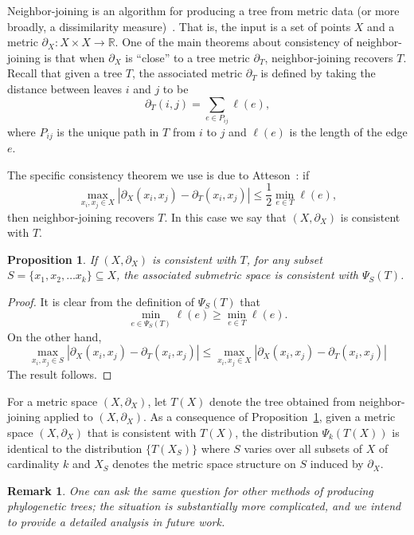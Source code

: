 \documentclass[a4paper,11pt]{article}
\newtheorem{proposition}[theorem]{Proposition}
\newtheorem{remark}[theorem]{Remark}
\begin{document}
Neighbor-joining is an algorithm for producing a tree from metric data (or more broadly, a dissimilarity measure)~\cite{felsenstein2003}.
That is, the input is a set of points $X$ and a metric $\partial_X \colon X \times X \to \mathbb{R}$.
One of the main theorems about consistency of neighbor-joining is that when $\partial_X$ is ``close'' to a tree metric $\partial_T$, neighbor-joining recovers $T$.
Recall that given a tree $T$, the associated metric $\partial_T$ is defined by taking the distance between leaves $i$ and $j$ to be 
\[
\partial_T(i,j) = \sum_{e \in P_{ij}} \ell(e),
\]
where $P_{ij}$ is the unique path in $T$ from $i$ to $j$ and $\ell(e)$ is the length of the edge $e$.

The specific consistency theorem we use is due to Atteson~\cite{atteson}: if
\[
\max_{x_i,x_j \in X} |\partial_X(x_i,x_j) - \partial_T(x_i,x_j)| \leq \frac{1}{2} \min_{e \in T} \ell(e),
\]
then neighbor-joining recovers $T$.
In this case we say that $(X, \partial_X)$ is consistent with $T$.

\begin{proposition}\label{prop:subnj}
If $(X,\partial_X)$ is consistent with $T$, for any subset $S = \{x_1, x_2, \ldots x_k\} \subseteq X$, the associated submetric space is consistent with $\Psi_S(T)$.
\end{proposition}

\begin{proof}
It is clear from the definition of $\Psi_S(T)$ that 
\[
\min_{e \in \Psi_S(T)} \ell(e) \geq \min_{e \in T} \ell(e).
\]
On the other hand, 
\[
\max_{x_i,x_j \in S} |\partial_X(x_i,x_j) - \partial_T(x_i,x_j)| \leq
\max_{x_i,x_j \in X} |\partial_X(x_i,x_j) - \partial_T(x_i,x_j)| 
\]
The result follows.
\end{proof}

For a metric space $(X,\partial_X)$, let $T(X)$ denote the tree obtained from neighbor-joining applied to $(X,\partial_X)$.
As a consequence of Proposition~\ref{prop:subnj}, given a metric space $(X, \partial_X)$ that is consistent with $T(X)$, the distribution $\Psi_k(T(X))$ is identical to the distribution $\{T(X_S)\}$ where $S$ varies over all subsets of $X$ of cardinality $k$ and $X_S$ denotes the metric space structure on $S$ induced by $\partial_X$.

\begin{remark}
One can ask the same question for other methods of producing phylogenetic trees; the situation is substantially more complicated, and we intend to provide a detailed analysis in future work.
\end{remark}
\end{document}
